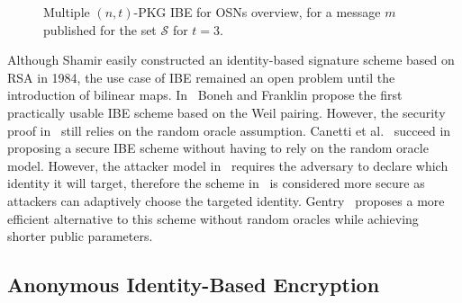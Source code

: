 \begin{figure}[ht]
\begin{center}
{
    }
    \end{center}
    \caption{Multiple $(n,t)$-PKG IBE for OSNs overview, for a message $m$ published for the set $\mathcal{S}$ for $t=3$.}
    \label{fig:overview}
\end{figure}


Although Shamir easily constructed an identity-based signature scheme based on RSA in 1984, the use case of IBE remained an open problem until the introduction of bilinear maps. In~\cite{art:BonehF01} Boneh and Franklin propose the first practically usable IBE scheme based on the Weil pairing. However, the security proof in~\cite{art:BonehF01} still relies on the random oracle assumption. Canetti et al.~\cite{art:CanettiHK03} succeed in proposing a secure IBE scheme without having to rely on the random oracle model. However, the attacker model in~\cite{art:CanettiHK03} requires the adversary to declare which identity it will target, therefore the scheme in~\cite{art:BonehF01} is considered more secure as attackers can adaptively choose the targeted identity. Gentry~\cite{GentryRandomOracles} proposes a more efficient alternative to this scheme without random oracles while achieving shorter public parameters. 

\subsection{Anonymous Identity-Based Encryption}

